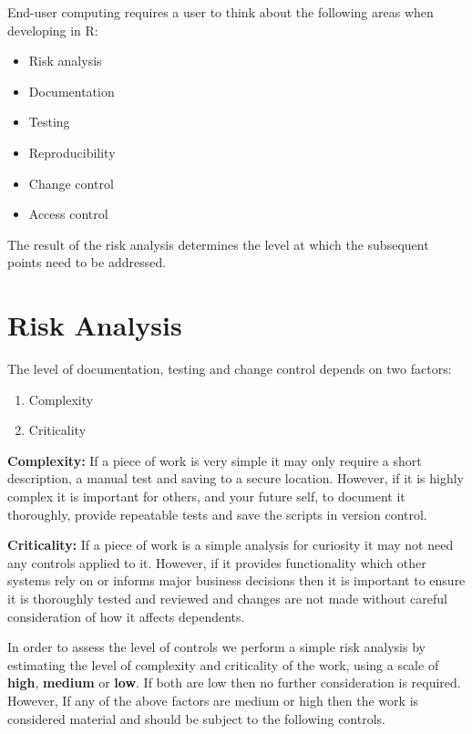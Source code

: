 \documentclass[]{book}
\providecommand{\tightlist}{%
  \setlength{\itemsep}{0pt}\setlength{\parskip}{0pt}}
\theoremstyle{definition}
\theoremstyle{definition}
\theoremstyle{definition}
\theoremstyle{remark}
\begin{document}
End-user computing requires a user to think about the following areas
when developing in R:

\begin{itemize}
\tightlist
\item
  Risk analysis
\item
  Documentation
\item
  Testing
\item
  Reproducibility
\item
  Change control
\item
  Access control
\end{itemize}

The result of the risk analysis determines the level at which the
subsequent points need to be addressed.

\section{Risk Analysis}\label{risk-analysis}

The level of documentation, testing and change control depends on two
factors:

\begin{enumerate}
\def\labelenumi{\arabic{enumi}.}
\tightlist
\item
  Complexity
\item
  Criticality
\end{enumerate}

\textbf{Complexity:} If a piece of work is very simple it may only
require a short description, a manual test and saving to a secure
location. However, if it is highly complex it is important for others,
and your future self, to document it thoroughly, provide repeatable
tests and save the scripts in version control.

\textbf{Criticality:} If a piece of work is a simple analysis for
curiosity it may not need any controls applied to it. However, if it
provides functionality which other systems rely on or informs major
business decisions then it is important to ensure it is thoroughly
tested and reviewed and changes are not made without careful
consideration of how it affects dependents.

In order to assess the level of controls we perform a simple risk
analysis by estimating the level of complexity and criticality of the
work, using a scale of \textbf{high}, \textbf{medium} or \textbf{low}.
If both are low then no further consideration is required. However, If
any of the above factors are medium or high then the work is considered
material and should be subject to the following controls.
\end{document}
